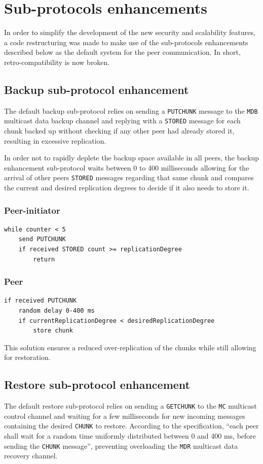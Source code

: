 \documentclass[a4paper,11pt]{article}
\begin{document}
\newpage
\tableofcontents
\newpage

\section{Sub-protocols enhancements}

In order to simplify the development of the new security and scalability features, a code restructuring was made to make use of the sub-protocols enhancements described below as the default system for the peer communication. In short, retro-compatibility is now broken.

\subsection{Backup sub-protocol enhancement}
The default backup sub-protocol relies on sending a \texttt{PUTCHUNK} message to the \texttt{MDB} multicast data backup channel and replying with a \texttt{STORED} message for each chunk backed up without checking if any other peer had already stored it, resulting in excessive replication.

In order not to rapidly deplete the backup space available in all peers, the backup enhancement sub-protocol waits between 0 to 400 milliseconds allowing for the arrival of other peers \texttt{STORED} messages regarding that same chunk and compares the current and desired replication degrees to decide if it also needs to store it.

\subsubsection*{Peer-initiator}
\begin{verbatim}
while counter < 5
    send PUTCHUNK
    if received STORED count >= replicationDegree
        return
\end{verbatim}

\subsubsection*{Peer}
\begin{verbatim}
if received PUTCHUNK
    random delay 0-400 ms
    if currentReplicationDegree < desiredReplicationDegree
        store chunk
\end{verbatim}

This solution ensures a reduced over-replication of the chunks while still allowing for restoration.

\subsection{Restore sub-protocol enhancement}
The default restore sub-protocol relies on sending a \texttt{GETCHUNK} to the \texttt{MC} multicast control channel and waiting for a few milliseconds for new incoming messages containing the desired \texttt{CHUNK} to restore. According to the specification, ``each peer shall wait for a random time uniformly distributed between 0 and 400 ms, before sending the \texttt{CHUNK} message'', preventing overloading the \texttt{MDR} multicast data recovery channel.
\end{document}
